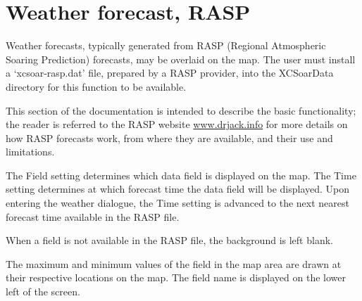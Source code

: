 \section{Weather forecast, RASP}\label{sec:weather-forecast}

Weather forecasts, typically generated from RASP (Regional Atmospheric
Soaring Prediction)
forecasts, may be overlaid on the map. The user
must install a `xcsoar-rasp.dat' file, prepared by a RASP provider,
into the XCSoarData directory for this function to be available.

This section of the documentation is intended to describe the basic
functionality; the reader is referred to the RASP website
\url{www.drjack.info} for more details on how RASP forecasts work, from where 
they are available, and their use and limitations.

The Field setting determines which data field is displayed on the map.
The Time setting determines at which forecast time the data field will
be displayed.  Upon entering the weather dialogue, the Time setting is
advanced to the next nearest forecast time available in the RASP file.

When a field is not available in the RASP file, the background is left blank.

The maximum and minimum values of the field in the map area are drawn
at their respective locations on the map.  The field name is displayed
on the lower left of the screen.

